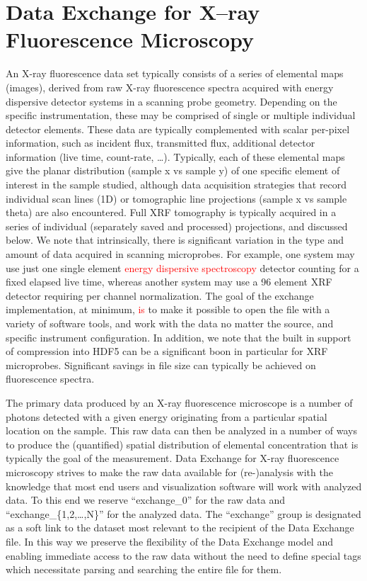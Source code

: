 \documentclass[pdf]{iucr}              %
\begin{document}
\section{Data Exchange for X--ray Fluorescence Microscopy}

An X-ray fluorescence data set typically consists of a series of elemental maps (images), derived from raw X-ray fluorescence spectra acquired with energy dispersive detector systems in a scanning probe geometry. Depending on the specific instrumentation, these may be comprised of single or multiple individual detector elements. These data are typically complemented with scalar per-pixel information, such as incident flux, transmitted flux, additional detector information (live time, count-rate, \ldots). Typically, each of these elemental maps give the planar distribution (sample x vs sample y) of one specific element of interest in the sample studied, although data acquisition strategies that record individual scan lines (1D) or tomographic line projections (sample x vs sample theta) are also encountered. Full XRF tomography is typically acquired in a series of individual (separately saved and processed) projections, and discussed below. We note that intrinsically, there is significant variation in the type and amount of data acquired in scanning microprobes. For example, one system may use just one single element \textcolor{red}{energy dispersive spectroscopy} detector counting for a fixed elapsed live time, whereas another system may use a 96 element XRF detector requiring per channel normalization. The goal of the exchange implementation, at minimum, \textcolor{red}{is} to make it possible to open the file with a variety of software tools, and work with the data no matter the source, and specific instrument configuration. In addition, we note that the built in support of compression into HDF5 can be a significant boon in particular for XRF microprobes. Significant savings in file size can typically be achieved on fluorescence spectra. 

The primary data produced by an X-ray fluorescence microscope is a number of photons detected with a given energy originating from a particular spatial location on the sample. This raw data can then be analyzed in a number of ways to produce the (quantified) spatial distribution of elemental concentration that is typically the goal of the measurement. Data Exchange for X-ray fluorescence microscopy strives to make the raw data available for (re-)analysis with the knowledge that most end users and visualization software will work with analyzed data. To this end we reserve ``exchange\_0'' for the raw data and ``exchange\_\{1,2,\ldots,N\}'' for the analyzed data. The ``exchange'' group is designated as a soft link to the dataset most relevant to the recipient of the Data Exchange file. In this way we preserve the flexibility of the Data Exchange model and enabling immediate access to the raw data without the need to define special tags which necessitate parsing and searching the entire file for them.
\end{document}
